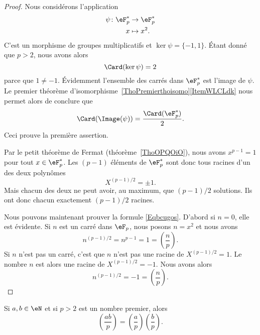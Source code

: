 \begin{proof}
	Nous considérons l'application
	\begin{equation}
		\begin{aligned}
			\psi\colon \eF^*_p & \to \eF^*_p  \\
			x                  & \mapsto x^2.
		\end{aligned}
	\end{equation}
	C'est un morphisme de groupes multiplicatifs et \( \ker\psi=\{ -1,1 \}\). Étant donné que \( p>2\), nous avons alors
	\begin{equation}
		\Card(\ker\psi)=2
	\end{equation}
	parce que \( 1\neq -1\). Évidemment l'ensemble des carrés dans \( \eF^*_p\) est l'image de \( \psi\). Le premier théorème d'isomorphisme~\ref{ThoPremierthoisomo}\ref{ItemWLCLdk} nous permet alors de conclure que
	\begin{equation}
		\Card(\Image(\psi))=\frac{ \Card(\eF^*_p) }{2}.
	\end{equation}
	Ceci prouve la première assertion.

	Par le petit théorème de Fermat (théorème~\ref{ThoOPQOiO}), nous avons \( x^{p-1}=1\) pour tout \( x\in \eF^*_p\). Les \( (p-1)\) éléments de \( \eF^*_p\) sont donc tous racines d'un des deux polynômes
	\begin{equation}
		X^{(p-1)/2}=\pm 1.
	\end{equation}
	Mais chacun des deux ne peut avoir, au maximum, que \( (p-1)/2\) solutions. Ils ont donc chacun exactement \( (p-1)/2\) racines.

	Nous pouvons maintenant prouver la formule \eqref{Eqbcugos}. D'abord si \( n=0\), elle est évidente. Si \( n\) est un carré dans \( \eF_p\), nous posons \( n=x^2\) et nous avons
	\begin{equation}
		n^{(p-1)/2}=n^{p-1}=1=\left(\frac{n}{p}\right).
	\end{equation}
	Si \( n\) n'est pas un carré, c'est que \( n\) n'est pas une racine de \( X^{(p-1)/2}=1\). Le nombre \( n\) est alors une racine de \( X^{(p-1)/2}=-1\). Nous avons alors
	\begin{equation}
		n^{(p-1)/2}=-1=\left(\frac{n}{p}\right).
	\end{equation}
\end{proof}

\begin{corollary}   \label{CoruJosNz}
	Si \( a,b\in \eN\) et si \( p>2\) est un nombre premier, alors
	\begin{equation}
		\left(\frac{ab}{p}\right)=\left(\frac{a}{p}\right)\left(\frac{b}{p}\right).
	\end{equation}
\end{corollary}

